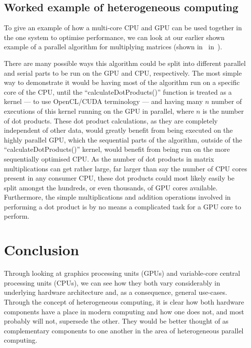 \documentclass[a4paper,11pt]{article}
\begin{document}

\subsection{Worked example of heterogeneous computing} %
\label{sub:worked_example_of_heterogeneous_computing}
To give an example of how a multi-core CPU and GPU can be used together in the one system to optimise performance, we
can look at our earlier shown example of a parallel algorithm for multiplying matrices (shown in~
in~).

There are many possible ways this algorithm could be split into different parallel and serial parts to be run on the GPU
and CPU, respectively. The most simple way to demonstrate it would be having most of the algorithm run on a specific core
of the CPU, until the ``calculateDotProducts()'' function is treated as a kernel --- to use OpenCL/CUDA terminology ---
and having many $n$ number of executions of this kernel running on the GPU in parallel, where $n$ is the number of dot
products. These dot product calculations, as they are completely independent of other data, would greatly benefit from
being executed on the highly parallel GPU, which the sequential parts of the algorithm, outside of the ``calculateDotProducts()''
kernel, would benefit from being run on the more sequentially optimised CPU. As the number of dot products in matrix
multiplications can get rather large, far larger than say the number of CPU cores present in any consumer CPU, these
dot products could most likely easily be split amongst the hundreds, or even thousands, of GPU cores available. Furthermore,
the simple multiplications and addition operations involved in performing a dot product is by no means a complicated
task for a GPU core to perform.


\newpage


\section{Conclusion} %
\label{sec:conclusion}
Through looking at graphics processing units (GPUs) and variable-core central processing units (CPUs), we can see how
they both vary considerably in underlying hardware architecture and, as a consequence, general use-cases. Through the
concept of heterogeneous computing, it is clear how both hardware components have a place in modern computing and how
one does not, and most probably will not, supersede the other. They would be better thought of as complementary components
to one another in the area of heterogeneous parallel computing.


\newpage




\end{document}
